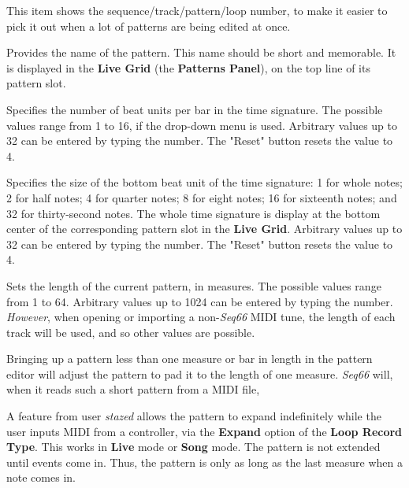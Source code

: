    \setcounter{ItemCounter}{0}      %

   This item shows the sequence/track/pattern/loop
   number, to make it easier to pick it out when a lot of patterns are being
   edited at once.

   Provides the name of the pattern.
   This name should be short and memorable.
   It is displayed in the \textbf{Live Grid} (the \textbf{Patterns Panel}),
   on the top line of its pattern slot.

   Specifies the number of beat units per bar in the time signature.
   The possible values range from 1 to 16, if the drop-down menu is used.
   Arbitrary values up to 32 can be entered by typing the number.
   The "Reset" button resets the value to 4.

   Specifies the size of the bottom beat unit of the time signature:
   1 for whole notes; 2 for half notes; 4 for quarter notes; 8 for eight notes;
   16 for sixteenth notes; and 32 for thirty-second notes.
   The whole time signature is display at the bottom center of the
   corresponding pattern slot in the \textbf{Live Grid}.
   Arbitrary values up to 32 can be entered by typing the number.
   The "Reset" button resets the value to 4.

   Sets the length of the current pattern, in measures.
   The possible values range from 1 to 64.
   Arbitrary values up to 1024 can be entered by typing the number.
   \textsl{However}, when opening or importing a non-\textsl{Seq66}
   MIDI tune, the length of each track will be used, and so other values
   are possible.

   Bringing up a pattern less than one measure or bar in
   length in the pattern editor will adjust the pattern to pad it to the
   length of one measure.
   \textsl{Seq66} will, when it reads such a short pattern
   from a MIDI file,

   A feature from user \textsl{stazed} allows the pattern to expand
   indefinitely while the user inputs MIDI from a controller, via the
   \textbf{Expand} option of the \textbf{Loop Record Type}.
   This works in \textbf{Live} mode or \textbf{Song} mode.
   The pattern is not extended until events come in.
   Thus, the pattern is only as long as the last measure when a note comes in.


